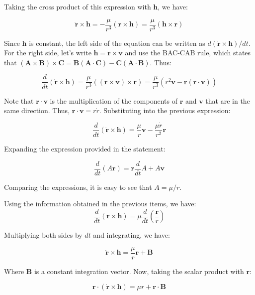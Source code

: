 \documentclass[11pt]{article}
\begin{document}
\begin{pproblem}
\begin{pssolution*}{}{}
\begin{alternativas}
        \item Taking the cross product of this expression with $\mathbf{h}$, we have:
        
        \[\ddot{\mathbf{r}}\times \mathbf{h} = -\frac{\mu}{r^3}(\mathbf{r}\times\mathbf{h}) = \frac{\mu}{r^3}(\mathbf{h}\times\mathbf{r})\]

        Since $\mathbf{h}$ is constant, the left side of the equation can be written as $d(\dot{\mathbf{r}}\times \mathbf{h})/dt$. For the right side, let's write $\mathbf{h} = \mathbf{r}\times \mathbf{v}$ and use the BAC-CAB rule, which states that $(\mathbf{A} \times \mathbf{B}) \times \mathbf{C} = \mathbf{B}(\mathbf{A}\cdot \mathbf{C}) - \mathbf{C}(\mathbf{A} \cdot \mathbf{B})$. Thus:

        \[\frac{d}{dt}(\dot{\mathbf{r}}\times \mathbf{h}) = \frac{\mu}{r^3}((\mathbf{r}\times\mathbf{v})\times \mathbf{r}) = \frac{\mu}{r^3}(r^2\mathbf{v} - \mathbf{r}(\mathbf{r}\cdot \mathbf{v}))\]

        Note that $\mathbf{r}\cdot\mathbf{v}$ is the multiplication of the components of $\mathbf{r}$ and $\mathbf{v}$ that are in the same direction. Thus, $\mathbf{r}\cdot\mathbf{v} = r\dot{r}$. Substituting into the previous expression:

        \[\boxed{\frac{d}{dt}(\dot{\mathbf{r}}\times \mathbf{h}) = \frac{\mu}{r}\mathbf{v} - \frac{\mu \dot{r}}{r^2}\mathbf{r}}\]

        \item Expanding the expression provided in the statement:
        
        \[\frac{d}{dt}(A\mathbf{r}) = \mathbf{r}\frac{d}{dt}A + A \mathbf{v}\]

        Comparing the expressions, it is easy to see that $\boxed{A = \mu/r}$.

        \item Using the information obtained in the previous items, we have:
        \[\frac{d}{dt}(\dot{\mathbf{r}}\times \mathbf{h}) = \mu\frac{d}{dt}\left(\frac{\mathbf{r}}{r}\right)\]

        Multiplying both sides by $dt$ and integrating, we have:

        \[\dot{\mathbf{r}}\times\mathbf{h} = \frac{\mu}{r}\mathbf{r} + \mathbf{B}\]

        Where $\mathbf{B}$ is a constant integration vector. Now, taking the scalar product with $\mathbf{r}$:

        \[\mathbf{r}\cdot(\dot{\mathbf{r}}\times \mathbf{h}) = \mu r + \mathbf{r}\cdot\mathbf{B}\]


\end{alternativas}
\end{pssolution*}
\end{pproblem}
\end{document}
